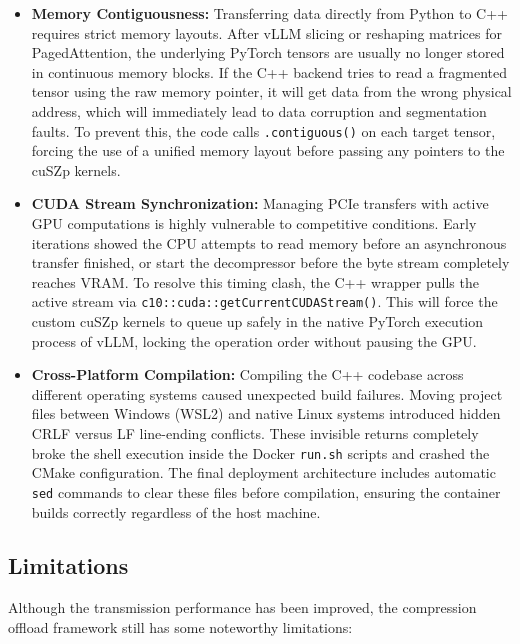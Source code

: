 \documentclass{polyu-comp}
\begin{document}
\begin{itemize}
    \item \textbf{Memory Contiguousness:} Transferring data directly from Python to C++ requires strict memory layouts. After vLLM slicing or reshaping matrices for PagedAttention, the underlying PyTorch tensors are usually no longer stored in continuous memory blocks. If the C++ backend tries to read a fragmented tensor using the raw memory pointer, it will get data from the wrong physical address, which will immediately lead to data corruption and segmentation faults. To prevent this, the code calls \texttt{.contiguous()} on each target tensor, forcing the use of a unified memory layout before passing any pointers to the cuSZp kernels.
    
    \item \textbf{CUDA Stream Synchronization:} Managing PCIe transfers with active GPU computations is highly vulnerable to competitive conditions. Early iterations showed the CPU attempts to read memory before an asynchronous transfer finished, or start the decompressor before the byte stream completely reaches VRAM. To resolve this timing clash, the C++ wrapper pulls the active stream via \texttt{c10::cuda::getCurrentCUDAStream()}. This will force the custom cuSZp kernels to queue up safely in the native PyTorch execution process of vLLM, locking the operation order without pausing the GPU.
    
    \item \textbf{Cross-Platform Compilation:} Compiling the C++ codebase across different operating systems caused unexpected build failures. Moving project files between Windows (WSL2) and native Linux systems introduced hidden CRLF versus LF line-ending conflicts. These invisible returns completely broke the shell execution inside the Docker \texttt{run.sh} scripts and crashed the CMake configuration. The final deployment architecture includes automatic \texttt{sed} commands to clear these files before compilation, ensuring the container builds correctly regardless of the host machine.
\end{itemize}

\subsection{Limitations}

Although the transmission performance has been improved, the compression offload framework still has some noteworthy limitations:
\end{document}
